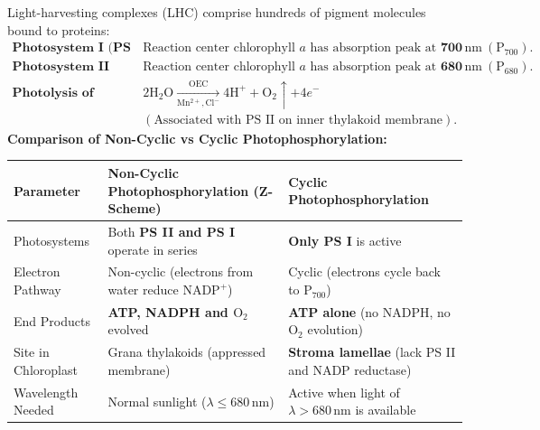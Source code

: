 \documentclass[10pt,a4paper]{article}
\begin{document}
\begin{formulabox}
Light-harvesting complexes (LHC) comprise hundreds of pigment molecules bound to proteins:
\begin{align*}
  \textbf{Photosystem I (PS I): } & \text{Reaction center chlorophyll } a \text{ has absorption peak at } \mathbf{700\,\mathrm{nm}} \ (\mathrm{P_{700}}).\\
  \textbf{Photosystem II (PS II): } & \text{Reaction center chlorophyll } a \text{ has absorption peak at } \mathbf{680\,\mathrm{nm}} \ (\mathrm{P_{680}}).\\
  \textbf{Photolysis of Water: } & 2\mathrm{H_2O} \xrightarrow[\mathrm{Mn^{2+}, Cl^-}]{\text{OEC}} 4\mathrm{H}^+ + \mathrm{O}_2 \uparrow + 4e^-\\
  & (\text{Associated with PS II on inner thylakoid membrane}).
\end{align*}
\textbf{Comparison of Non-Cyclic vs Cyclic Photophosphorylation:}
\begin{center}
\small
\begin{tabular}{|l|p{6.2cm}|p{6.2cm}|}
\hline
\textbf{Parameter} & \textbf{Non-Cyclic Photophosphorylation (Z-Scheme)} & \textbf{Cyclic Photophosphorylation} \\
\hline
Photosystems & Both \textbf{PS II and PS I} operate in series & \textbf{Only PS I} is active \\
Electron Pathway & Non-cyclic (electrons from water reduce $\mathrm{NADP}^+$) & Cyclic (electrons cycle back to $\mathrm{P_{700}}$) \\
End Products & \textbf{ATP, NADPH and $\mathrm{O}_2$} evolved & \textbf{ATP alone} (no NADPH, no $\mathrm{O}_2$ evolution) \\
Site in Chloroplast & Grana thylakoids (appressed membrane) & \textbf{Stroma lamellae} (lack PS II and NADP reductase) \\
Wavelength Needed & Normal sunlight ($\lambda \le 680\,\mathrm{nm}$) & Active when light of $\lambda > 680\,\mathrm{nm}$ is available \\
\hline
\end{tabular}
\end{center}
\end{formulabox}
\end{document}
